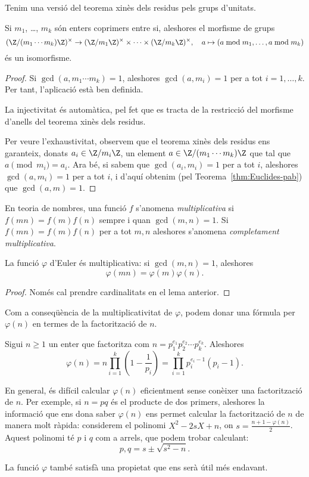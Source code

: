  Tenim una versió del teorema xinès dels residus pels grups d'unitats.
 \begin{lemma}
 Si $m_1$, \ldots, $m_k$ són enters coprimers entre si, aleshores el morfisme de grups
  \[
  (\Z/(m_1\cdots m_k)\Z)^\times\to(\Z/m_1\Z)^{\times} \times\cdots\times (\Z/m_k\Z)^{\times},\quad a\mapsto (a\bmod m_1,\ldots, a\bmod m_k)
  \]
  és un isomorfisme.
 \end{lemma}
 \begin{proof}
  Si $\gcd(a,m_1\cdots m_k) = 1$, aleshores $\gcd(a,m_i)=1$ per a tot $i=1,\ldots,k$. Per tant, l'aplicació està ben definida.
  
  La injectivitat és automàtica, pel fet que es tracta de la restricció del morfisme d'anells del teorema xinès dels residus.
  
  Per veure l'exhaustivitat, observem que el teorema xinès dels residus ens garanteix, donats $a_i \in \Z/m_i\Z$, un element $a\in\Z/(m_1\cdots m_k)\Z$ que tal que $a\pmod m_i = a_i$. Ara bé, si sabem que $\gcd(a_i,m_i)=1$ per a tot $i$, aleshores $\gcd(a,m_i)=1$ per a tot $i$, i d'aquí obtenim (pel Teorema~\ref{thm:Euclides-pab}) que $\gcd(a,m)=1$.
 \end{proof}
 
En teoria de nombres, una funció $f$ s'anomena \emph{multiplicativa} si $f(mn)=f(m)f(n)$ sempre i quan $\gcd(m,n)=1$. Si $f(mn)=f(m)f(n)$ per a tot $m,n$ aleshores s'anomena \emph{completament multiplicativa}.

 \begin{corollary}
 La funció $\varphi$ d'Euler és multiplicativa: si $\gcd(m,n)=1$, aleshores
 \[
 \varphi(mn)=\varphi(m)\varphi(n).
 \]
 \end{corollary}
 \begin{proof}
  Només cal prendre cardinalitats en el lema anterior.
 \end{proof}
Com a conseqüència de la multiplicativitat de $\varphi$, podem donar una fórmula per $\varphi(n)$ en termes de la factorització de $n$.
\begin{proposition}
 Sigui $n\geq 1$ un enter que factoritza com $n = p_1^{e_1} p_2^{e_2}\cdots p_k^{e_k}$. Aleshores
\[
\varphi(n)= n \prod_{i=1}^k \left(1-\frac{1}{p_i}\right) = \prod_{i=1}^k p_i^{e_i-1}(p_i-1).
\]
\end{proposition}

\begin{remark}
\label{rmk:factoritzar-i-phi}
En general, és difícil calcular $\varphi(n)$ eficientment sense conèixer una factorització de $n$. Per exemple, si $n=pq$ és el producte de dos primers, aleshores la informació que ens dona saber $\varphi(n)$ ens permet calcular la factorització de $n$ de manera molt ràpida: considerem el polinomi $X^2-2sX + n$, on $s = \frac{n+1-\varphi(n)}{2}$. Aquest polinomi té $p$ i $q$ com a arrels, que podem trobar calculant:
\[
p,q = s \pm \sqrt{s^2 - n}.
\]
\end{remark}
La funció $\varphi$ també satisfà una propietat que ens serà útil més endavant.

